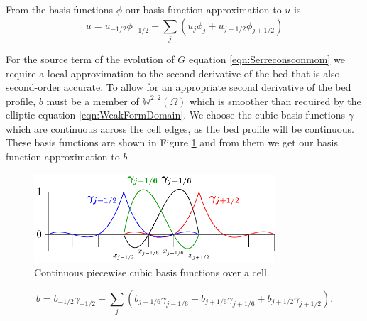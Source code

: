 From the basis functions $\phi$ our basis function approximation to $u$ is
\begin{equation}
u = u_{-1/2}\phi_{-1/2} + \sum_j \left( u_{j}\phi_{j} + u_{j+1/2}\phi_{j+1/2} \right)
\label{eqn:FEapproxtou}
\end{equation}

For the source term of the evolution of $G$ equation \eqref{eqn:Serreconsconmom} we require a local approximation to the second derivative of the bed that is also second-order accurate. To allow for an appropriate second derivative of the bed profile, $b$ must be a member of $\mathbb{W}^{2,2}(\Omega)$ which is smoother than required by the elliptic equation \eqref{eqn:WeakFormDomain}. We choose the cubic basis functions $\gamma$ which are continuous across the cell edges, as the bed profile will be continuous. These basis functions are shown in Figure \ref{fig:P3ContBasis} and from them we get our basis function approximation to $b$
\begin{figure}
	\centering
	\includegraphics[width=0.8\textwidth]{./chp3/figures/P3.pdf}
	\caption{Continuous piecewise cubic basis functions over a cell.}
	\label{fig:P3ContBasis}
\end{figure}
\begin{equation}
b = b_{-1/2}\gamma_{-1/2} +  \sum_j \left(b_{j-1/6}\gamma_{j-1/6}  + b_{j+1/6}\gamma_{j+1/6} + b_{j+1/2}\gamma_{j+1/2} \right).
\label{eqn:FEapproxtob}
\end{equation}

